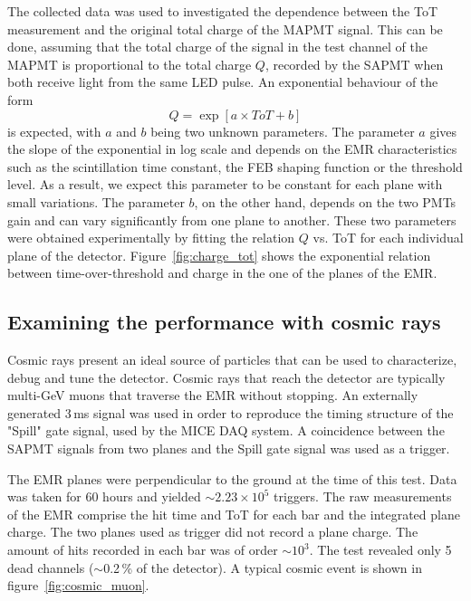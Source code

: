 \documentclass[a4paper,11pt]{article}
\begin{document}
The collected data was used to investigated the dependence between the ToT measurement and the original total charge of the MAPMT signal. This can be done,
assuming that the total charge of the signal in the test channel of the MAPMT is proportional to the total charge $Q$, recorded by the SAPMT when both
receive light from the same LED pulse. An exponential behaviour of the form
\begin{equation}
 Q=\exp\left[a\times ToT+b\right]
 \label{exp}
\end{equation}
is expected, with $a$ and $b$ being two unknown parameters. The parameter $a$ gives the slope of the exponential in log scale and depends on the EMR 
characteristics such as the scintillation time constant, the FEB shaping function or the threshold level. As a result, we expect this parameter to be
constant for each plane with small variations. The parameter $b$, on the other hand, depends on the two PMTs gain and can vary significantly from one
plane to another. These two parameters were obtained experimentally by fitting the relation $Q$ vs. ToT for each individual plane of the detector.
Figure~\ref{fig:charge_tot} shows the exponential relation between time-over-threshold and charge in the one of the planes of the EMR.

\subsection{Examining the performance with cosmic rays}\label{sec:cosmic_perf}
Cosmic rays present an ideal source of particles that can be used to characterize, debug and tune the detector. Cosmic rays that reach the detector are
typically multi-GeV muons that traverse the EMR without stopping. An externally generated 3\,ms signal was used in order to reproduce the timing structure
of the "Spill" gate signal, used by the MICE DAQ system. A coincidence between the SAPMT signals from two planes and the Spill gate signal was used
as a trigger.

The EMR planes were perpendicular to the ground at the time of this test. Data was taken for 60 hours and yielded $\sim2.23\times10^5$ triggers. The raw
measurements of the EMR comprise the hit time and ToT for each bar and the integrated plane charge. The two planes used as trigger
did not record a plane charge. The amount of hits recorded in each bar was of order $\sim10^3$.  The test revealed only 5 dead channels ($\sim$0.2\,\% of
the detector). A typical cosmic event is shown in figure~\ref{fig:cosmic_muon}. 
\end{document}
